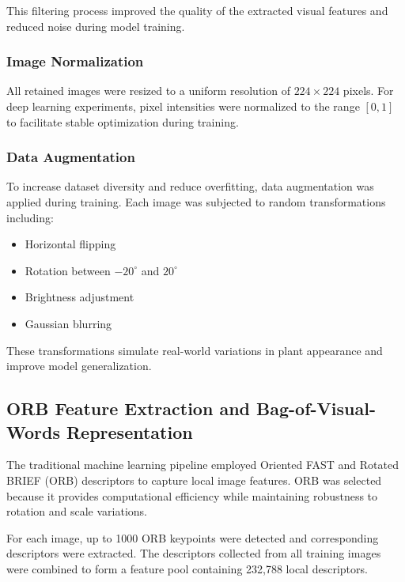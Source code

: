 This filtering process improved the quality of the extracted visual features and reduced noise during model training.


\subsubsection{Image Normalization}

All retained images were resized to a uniform resolution of $224 \times 224$ pixels. For deep learning experiments, pixel intensities were normalized to the range $[0,1]$ to facilitate stable optimization during training.

\subsubsection{Data Augmentation}

To increase dataset diversity and reduce overfitting, data augmentation was applied during training. Each image was subjected to random transformations including:

\begin{itemize}
\item Horizontal flipping
\item Rotation between $-20^\circ$ and $20^\circ$
\item Brightness adjustment
\item Gaussian blurring
\end{itemize}

These transformations simulate real-world variations in plant appearance and improve model generalization.


\subsection{ORB Feature Extraction and Bag-of-Visual-Words Representation}

The traditional machine learning pipeline employed Oriented FAST and Rotated BRIEF (ORB) descriptors to capture local image features. ORB was selected because it provides computational efficiency while maintaining robustness to rotation and scale variations.

For each image, up to 1000 ORB keypoints were detected and corresponding descriptors were extracted. The descriptors collected from all training images were combined to form a feature pool containing 232,788 local descriptors.

